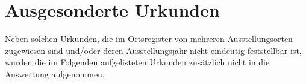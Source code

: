 
\section{Ausgesonderte Urkunden}
\label{subsec:ausgesurk}

Neben solchen Urkunden, die im Ortsregister von \citet{cao-online} mehreren
Ausstellungsorten zugewiesen sind und/oder deren Ausstellungsjahr nicht
eindeutig feststellbar ist, wurden die im Folgenden aufgelisteten Urkunden
zusätzlich nicht in die Auswertung aufgenommen.




